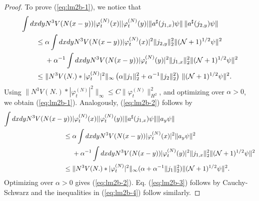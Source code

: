 \documentclass[11pt,a4paper]{article}
\newcommand{\cN}{{\cal N}}
\begin{document}
\begin{proof}
To prove (\ref{eq:lm2b-1}), we notice that
\[ \begin{split} 
\int dx dy &N^3 V(N (x-y)) |\varphi_t^{(N)} (x)| |\varphi_t^{(N)} (y)|  \| a^\sharp (j_{1,x}) \psi \| \, \| a^\sharp (j_{2,y}) \psi \| \\ \leq \; & \alpha \int dx dy N^3 V(N (x-y)) |\varphi^{(N)}_t (x)|^2 \| j_{2,y} \|_2^2 \| (\cN+1)^{1/2} \psi \|^2 \\ &+ \alpha^{-1}
 \int dx dy N^3 V(N (x-y)) |\varphi^{(N)}_t (y)|^2 \| j_{1,x} \|_2^2 \| (\cN+1)^{1/2} \psi \|^2 \\
 \leq \; & \| N^3 V(N.) * |\varphi_t^{(N)}|^2 \|_\infty  \left( \alpha \| j_{1} \|^2_2 + \alpha^{-1}
 \| j_2 \|_{2}^2 \right) \, \| (\cN+1)^{1/2} \psi \|^2.
 \end{split} \]
 Using $\| N^3 V(N.) * |\varphi_t^{(N)}|^2 \|_\infty \leq C \| \varphi_t^{(N)} \|_{H^2}^2$, and optimizing over $\alpha >0$, we obtain (\ref{eq:lm2b-1}). Analogously, (\ref{eq:lm2b-2}) follows by
\[ \begin{split} 
\int dx dy N^3 V(N (x-y)) &|\varphi^{(N)}_t (x)| |\varphi^{(N)}_t (y)| \| a^\sharp (j_{1,x}) \psi \| \| a_y \psi \| \\ 
\leq \; & \alpha \int dx dy N^3 V(N (x-y)) |\varphi^{(N)}_t (x)|^2 \| a_y \psi \|^2  \\ &+ \alpha^{-1}
 \int dx dy N^3 V(N (x-y)) |\varphi^{(N)}_t (y)|^2 \| j_{1,x} \|_2^2 \| (\cN+1)^{1/2} \psi \|^2 \\
 \leq \; & \| N^3 V(N.) * |\varphi_t^{(N)}|^2 \|_\infty (\alpha + \alpha^{-1} \| j_1\|_{2}^2) \| (\cN+1)^{1/2} \psi \|^2.
 \end{split} \]
 Optimizing over $\alpha >0$ gives (\ref{eq:lm2b-2}). Eq. (\ref{eq:lm2b-3}) follows by Cauchy-Schwarz and the inequalities in (\ref{eq:lm2b-4}) follow similarly.
\end{proof} 
\end{document}
